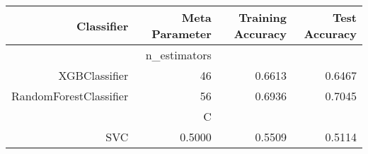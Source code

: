 \begin{tabular}{|r|r|r|r|}
    \hline
    Classifier &Meta Parameter &Training Accuracy
    &Test Accuracy\\
    \hline
    &n\_estimators &\multicolumn{2}{|r|}{}\\
    \hline
    XGBClassifier &46 &0.6613 &0.6467\\
    \hline
    RandomForestClassifier &56 &0.6936 &0.7045\\
    \hline
    &C &\multicolumn{2}{|r|}{}\\
    \hline
    SVC &0.5000 &0.5509 &0.5114\\
    \hline
\end{tabular}
